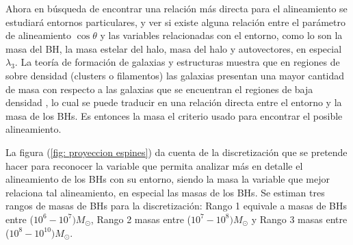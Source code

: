 Ahora en búsqueda de encontrar una relación más directa para el alineamiento se estudiará entornos particulares, y ver si existe alguna relación entre el parámetro de alineamiento $\cos\theta$ y las variables relacionadas con el entorno, como lo son la masa del BH, la masa estelar del halo, masa del halo y autovectores, en especial $\lambda_{3}$. La teoría de formación de galaxias y estructuras muestra que en regiones de sobre densidad (clusters o filamentos) las galaxias presentan una mayor cantidad de masa  con respecto a las galaxias que se encuentran el regiones de baja densidad  \cite{zhao2015}, lo cual se puede traducir en una relación directa entre el entorno y la masa de los BHs. Es entonces la masa el criterio usado para encontrar el posible alineamiento. 

La figura (\ref{fig: proyeccion espines}) da cuenta de la discretización que se pretende hacer para reconocer la variable que permita analizar más en detalle el alineamiento de los BHs con su entorno,  
siendo la masa la variable que mejor relaciona tal alineamiento, en especial las masas de los BHs.
Se estiman tres rangos de masas de BHs para la discretización: Rango 1 equivale a masas de BHs entre ($10^6-10^7)M_{\odot}$, Rango 2 masas entre ($10^7-10^8)M_{\odot}$ y Rango 3 masas entre ($10^8-10^10)M_{\odot}$. 



